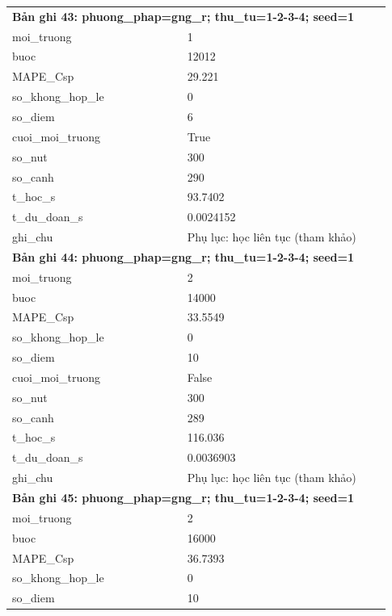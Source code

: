 \begin{longtable}{p{0.43\linewidth}p{0.50\linewidth}}
\midrule
\multicolumn{2}{p{0.95\linewidth}}{\textbf{Bản ghi 43: phuong\_phap=gng\_r; thu\_tu=1-2-3-4; seed=1}} \\
moi\_\allowbreak truong & 1 \\
buoc & 12012 \\
MAPE\_\allowbreak Csp & 29.221 \\
so\_\allowbreak khong\_\allowbreak hop\_\allowbreak le & 0 \\
so\_\allowbreak diem & 6 \\
cuoi\_\allowbreak moi\_\allowbreak truong & True \\
so\_\allowbreak nut & 300 \\
so\_\allowbreak canh & 290 \\
t\_\allowbreak hoc\_\allowbreak s & 93.7402 \\
t\_\allowbreak du\_\allowbreak doan\_\allowbreak s & 0.0024152 \\
ghi\_\allowbreak chu & Phụ lục: học liên tục (tham khảo) \\
\midrule
\multicolumn{2}{p{0.95\linewidth}}{\textbf{Bản ghi 44: phuong\_phap=gng\_r; thu\_tu=1-2-3-4; seed=1}} \\
moi\_\allowbreak truong & 2 \\
buoc & 14000 \\
MAPE\_\allowbreak Csp & 33.5549 \\
so\_\allowbreak khong\_\allowbreak hop\_\allowbreak le & 0 \\
so\_\allowbreak diem & 10 \\
cuoi\_\allowbreak moi\_\allowbreak truong & False \\
so\_\allowbreak nut & 300 \\
so\_\allowbreak canh & 289 \\
t\_\allowbreak hoc\_\allowbreak s & 116.036 \\
t\_\allowbreak du\_\allowbreak doan\_\allowbreak s & 0.0036903 \\
ghi\_\allowbreak chu & Phụ lục: học liên tục (tham khảo) \\
\midrule
\multicolumn{2}{p{0.95\linewidth}}{\textbf{Bản ghi 45: phuong\_phap=gng\_r; thu\_tu=1-2-3-4; seed=1}} \\
moi\_\allowbreak truong & 2 \\
buoc & 16000 \\
MAPE\_\allowbreak Csp & 36.7393 \\
so\_\allowbreak khong\_\allowbreak hop\_\allowbreak le & 0 \\
so\_\allowbreak diem & 10 \\

\end{longtable}
